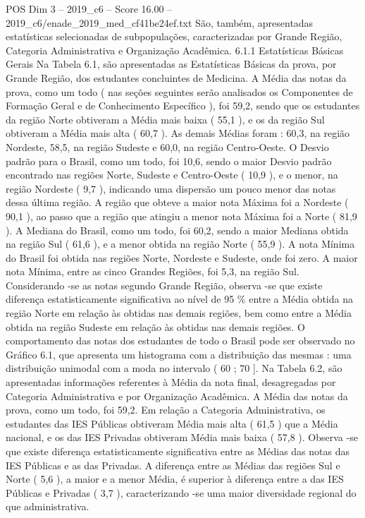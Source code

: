 \begin{textsample}{POS Dim 3 – 2019\_c6 – Score 16.00 – 2019\_c6/enade\_2019\_med\_cf41be24ef.txt}
São, também, apresentadas estatísticas selecionadas de subpopulações, caracterizadas por Grande Região, Categoria Administrativa e Organização Acadêmica. 6.1.1 Estatísticas Básicas Gerais Na Tabela 6.1, são apresentadas as Estatísticas Básicas da prova, por Grande Região, dos estudantes concluintes de Medicina.
A Média das notas da prova, como um todo ( nas seções seguintes serão analisados os Componentes de Formação Geral e de Conhecimento Específico ), foi 59,2, sendo que os estudantes da região Norte obtiveram a Média mais baixa ( 55,1 ), e os da região Sul obtiveram a Média mais alta ( 60,7 ).
As demais Médias foram : 60,3, na região Nordeste, 58,5, na região Sudeste e 60,0, na região Centro-Oeste.
O Desvio padrão para o Brasil, como um todo, foi 10,6, sendo o maior Desvio padrão encontrado nas regiões Norte, Sudeste e Centro-Oeste ( 10,9 ), e o menor, na região Nordeste ( 9,7 ), indicando uma dispersão um pouco menor das notas dessa última região.
A região que obteve a maior nota Máxima foi a Nordeste ( 90,1 ), ao passo que a região que atingiu a menor nota Máxima foi a Norte ( 81,9 ).
A Mediana do Brasil, como um todo, foi 60,2, sendo a maior Mediana obtida na região Sul ( 61,6 ), e a menor obtida na região Norte ( 55,9 ).
A nota Mínima do Brasil foi obtida nas regiões Norte, Nordeste e Sudeste, onde foi zero.
A maior nota Mínima, entre as cinco Grandes Regiões, foi 5,3, na região Sul.
Considerando -se as notas segundo Grande Região, observa -se que existe diferença estatisticamente significativa ao nível de 95 \% entre a Média obtida na região Norte em relação às obtidas nas demais regiões, bem como entre a Média obtida na região Sudeste em relação às obtidas nas demais regiões.
O comportamento das notas dos estudantes de todo o Brasil pode ser observado no Gráfico 6.1, que apresenta um histograma com a distribuição das mesmas : uma distribuição unimodal com a moda no intervalo ( 60 ; 70 ].
Na Tabela 6.2, são apresentadas informações referentes à Média da nota final, desagregadas por Categoria Administrativa e por Organização Acadêmica.
A Média das notas da prova, como um todo, foi 59,2.
Em relação a Categoria Administrativa, os estudantes das IES Públicas obtiveram Média mais alta ( 61,5 ) que a Média nacional, e os das IES Privadas obtiveram Média mais baixa ( 57,8 ).
Observa -se que existe diferença estatisticamente significativa entre as Médias das notas das IES Públicas e as das Privadas.
A diferença entre as Médias das regiões Sul e Norte ( 5,6 ), a maior e a menor Média, é superior à diferença entre a das IES Públicas e Privadas ( 3,7 ), caracterizando -se uma maior diversidade regional do que administrativa.

\end{textsample}
